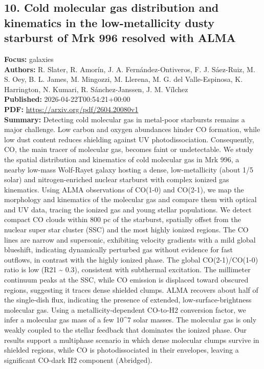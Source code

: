 \documentclass[11pt]{article}
\begin{document}
\subsection*{10. Cold molecular gas distribution and kinematics in the low-metallicity dusty starburst of Mrk 996 resolved with ALMA}
\textbf{Focus:} galaxies\\
\textbf{Authors:} R. Slater, R. Amorín, J. A. Fernández-Ontiveros, F. J. Sáez-Ruiz, M. S. Oey, B. L. James, M. Mingozzi, M. Llerena, M. G. del Valle-Espinosa, K. Harrington, N. Kumari, R. Sánchez-Janssen, J. M. Vílchez\\
\textbf{Published:} 2026-04-22T00:54:21+00:00\\
\textbf{PDF:} \href{https://arxiv.org/pdf/2604.20080v1}{https://arxiv.org/pdf/2604.20080v1}\\
\textbf{Summary:}
Detecting cold molecular gas in metal-poor starbursts remains a major challenge. Low carbon and oxygen abundances hinder CO formation, while low dust content reduces shielding against UV photodissociation. Consequently, CO, the main tracer of molecular gas, becomes faint or undetectable. We study the spatial distribution and kinematics of cold molecular gas in Mrk 996, a nearby low-mass Wolf-Rayet galaxy hosting a dense, low-metallicity (about 1/5 solar) and nitrogen-enriched nuclear starburst with complex ionized gas kinematics. Using ALMA observations of CO(1-0) and CO(2-1), we map the morphology and kinematics of the molecular gas and compare them with optical and UV data, tracing the ionized gas and young stellar populations. We detect compact CO clouds within 800 pc of the starburst, spatially offset from the nuclear super star cluster (SSC) and the most highly ionized regions. The CO lines are narrow and supersonic, exhibiting velocity gradients with a mild global blueshift, indicating dynamically perturbed gas without evidence for fast outflows, in contrast with the highly ionized phase. The global CO(2-1)/CO(1-0) ratio is low (R21 \textasciitilde{} 0.3), consistent with subthermal excitation. The millimeter continuum peaks at the SSC, while CO emission is displaced toward obscured regions, suggesting it traces dense shielded clumps. ALMA recovers about half of the single-dish flux, indicating the presence of extended, low-surface-brightness molecular gas. Using a metallicity-dependent CO-to-H2 conversion factor, we infer a molecular gas mass of a few 10\textasciicircum{}7 solar masses. The molecular gas is only weakly coupled to the stellar feedback that dominates the ionized phase. Our results support a multiphase scenario in which dense molecular clumps survive in shielded regions, while CO is photodissociated in their envelopes, leaving a significant CO-dark H2 component (Abridged).
\end{document}
